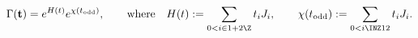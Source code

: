 \begin{gather}\label{Gamma-bt2}
\Gamma({\bf t})=e^{H(t)}e^{\chi(t_\mathrm{odd})} ,\qquad  \mbox{where}\quad
H(t):=\sum_{0< i\in 1+2\Z}  t_i J_{i} ,\qquad
\chi(t_\mathrm{odd}):=\sum_{0< i\INZ12}  t_i J_{i} .
\end{gather}
